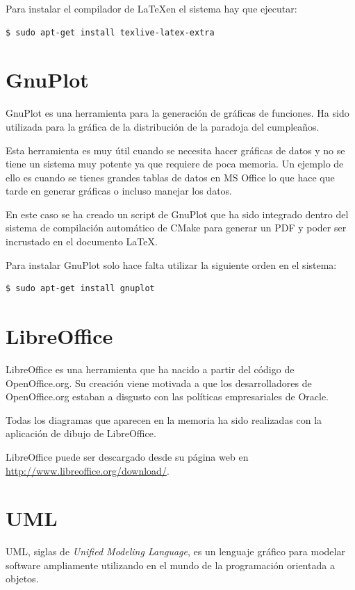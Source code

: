 Para instalar el compilador de \LaTeX en el sistema hay que ejecutar:

\begin{verbatim}
$ sudo apt-get install texlive-latex-extra
\end{verbatim}

\section{GnuPlot}

GnuPlot es una herramienta para la generación de gráficas de funciones. Ha sido utilizada para la gráfica de la distribución de la paradoja del cumpleaños.

Esta herramienta es muy útil cuando se necesita hacer gráficas de datos y no se tiene un sistema muy potente ya que requiere de poca memoria. Un ejemplo de ello es cuando se tienes grandes tablas de datos en MS Office lo que hace que tarde en generar gráficas o incluso manejar los datos.

En este caso se ha creado un script de GnuPlot que ha sido integrado dentro del sistema de compilación automático de CMake para generar un PDF y poder ser incrustado en el documento \LaTeX.

Para instalar GnuPlot solo hace falta utilizar la siguiente orden en el sistema:

\begin{verbatim}
$ sudo apt-get install gnuplot
\end{verbatim}

\section{LibreOffice}

LibreOffice es una herramienta que ha nacido a partir del código de OpenOffice.org. Su creación viene motivada a que los desarrolladores de OpenOffice.org estaban a disgusto con las políticas empresariales de Oracle.

Todas los diagramas que aparecen en la memoria ha sido realizadas con la aplicación de dibujo de LibreOffice.

LibreOffice puede ser descargado desde su página web en \url{http://www.libreoffice.org/download/}.

\section{UML}

UML, siglas de \emph{Unified Modeling Language}, es un lenguaje gráfico para modelar software ampliamente utilizando en el mundo de la programación orientada a objetos.

